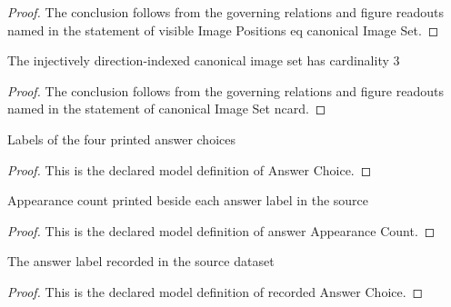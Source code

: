 \begin{proof}
  The conclusion follows from the governing relations and figure readouts named in the statement of visible Image Positions eq canonical Image Set.
\end{proof}
\begin{lemma}
  \label{lem:physics:phyx-mini-0164:phyxminiproblems-problemphyxmini0164-canonicalimageset-ncard}
  The injectively direction-indexed canonical image set has cardinality 3
\end{lemma}
\begin{proof}
  The conclusion follows from the governing relations and figure readouts named in the statement of canonical Image Set ncard.
\end{proof}
\begin{definition}
  \label{def:physics:phyx-mini-0164:phyxminiproblems-problemphyxmini0164-answerchoice}
  Labels of the four printed answer choices
\end{definition}
\begin{proof}
  This is the declared model definition of Answer Choice.
\end{proof}
\begin{definition}
  \label{def:physics:phyx-mini-0164:phyxminiproblems-problemphyxmini0164-answerappearancecount}
  Appearance count printed beside each answer label in the source
\end{definition}
\begin{proof}
  This is the declared model definition of answer Appearance Count.
\end{proof}
\begin{definition}
  \label{def:physics:phyx-mini-0164:phyxminiproblems-problemphyxmini0164-recordedanswerchoice}
  The answer label recorded in the source dataset
\end{definition}
\begin{proof}
  This is the declared model definition of recorded Answer Choice.
\end{proof}
